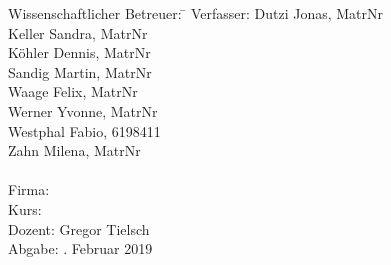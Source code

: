 \begin{titlepage}
\begin{center}
\begin{minipage}{\textwidth}
\begin{tabbing}
	Wissenschaftlicher Betreuer: \hspace{0.35cm}\=\kill
	Verfasser: 
		\> Dutzi Jonas, MatrNr \\
		\> Keller Sandra, MatrNr \\
		\> Köhler Dennis, MatrNr \\
		\> Sandig Martin, MatrNr \\
		\> Waage Felix, MatrNr \\
		\> Werner Yvonne, MatrNr \\
		\> Westphal Fabio, 6198411 \\
		\> Zahn Milena, MatrNr \\\\
	Firma: \> \DerNameDerFirma  \\[1.5mm]
	Kurs: \> \DieKursbezeichnung \\[1.5mm]
	Dozent: \> Gregor Tielsch \\[1.5mm]
	Abgabe: . Februar 2019
\end{tabbing}
\end{minipage}

\end{center}

\end{titlepage}